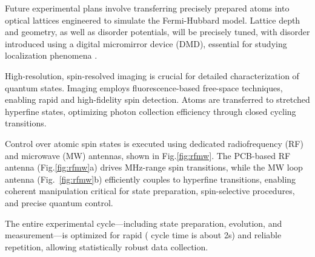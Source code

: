 Future experimental plans involve transferring precisely prepared atoms into optical lattices engineered to simulate the Fermi-Hubbard model. Lattice depth and geometry, as well as disorder potentials, will be precisely tuned, with disorder introduced using a digital micromirror device (DMD), essential for studying localization phenomena \cite{huang_construction_2024}.

High-resolution, spin-resolved imaging is crucial for detailed characterization of quantum states. Imaging employs fluorescence-based free-space techniques, enabling rapid and high-fidelity spin detection. Atoms are transferred to stretched hyperfine states, optimizing photon collection efficiency through closed cycling transitions.

Control over atomic spin states is executed using dedicated radiofrequency (RF) and microwave (MW) antennas, shown in Fig.\ref{fig:rfmw}. The PCB-based RF antenna (Fig.\ref{fig:rfmw}a) drives MHz-range spin transitions, while the MW loop antenna (Fig.~\ref{fig:rfmw}b) efficiently couples to hyperfine transitions, enabling coherent manipulation critical for state preparation, spin-selective procedures, and precise quantum control.

The entire experimental cycle—including state preparation, evolution, and measurement—is optimized for rapid ( cycle time is about 2s) and reliable repetition, allowing statistically robust data collection. 